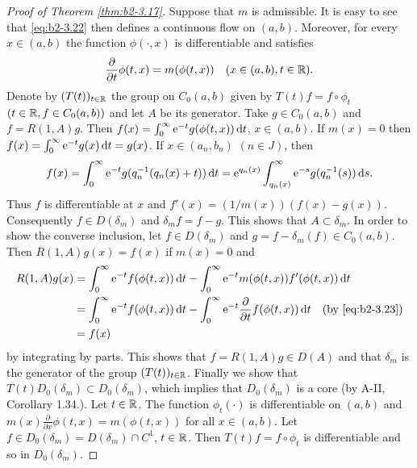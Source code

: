 \begin{proof}[Proof of Theorem \ref{thm:b2-3.17}]
Suppose that $m$ is admissible.
It is easy to see that \eqref{eq:b2-3.22} then defines a continuous flow on $(a,b)$.
Moreover, for every $x \in (a,b)$ the function $\phi(\cdot,x)$ is differentiable and satisfies
\begin{equation}\label{eq:b2-3.23}
\frac{\partial}{\partial t}\phi(t,x) = m(\phi(t,x)) \quad (x \in (a,b), t \in \mathbb{R}).
\end{equation}
Denote by $(T(t))_{t \in \mathbb{R}}$ the group on $C_{0}(a,b)$ given by $T(t)f = f \circ \phi_{t}$ $(t \in \mathbb{R}, f \in C_{0}(a,b))$ and let $A$ be its generator.
Take $g \in C_{0}(a,b)$ and $f = R(1,A)g$.
Then $f(x) = \int_{0}^{\infty} \mathrm{e}^{-t}g(\phi(t,x)) \mathop{}\!\mathrm{d}{t}$, $x \in (a,b)$.
If $m(x) = 0$ then $f(x) = \int_{0}^{\infty} \mathrm{e}^{-t}g(x) \mathop{}\!\mathrm{d}{t} = g(x)$.
If $x \in (a_{n},b_{n})$ $(n \in J)$, then 
\[
f(x) = \int_{0}^{\infty} \mathrm{e}^{-t}g(q_{n}^{-1}(q_{n}(x) + t)) \mathop{}\!\mathrm{d}{t} = \mathrm{e}^{q_{n}(x)} \int_{q_{n}(x)}^{\infty} \mathrm{e}^{-s}g(q_{n}^{-1}(s)) \mathop{}\!\mathrm{d}{s}.
\]
Thus $f$ is differentiable at $x$ and $f'(x) = (1/m(x))(f(x) - g(x))$.
Consequently $f \in D(\delta_{m})$ and $\delta_{m}f = f - g$.
This shows that $A \subset \delta_{m}$.
In order to show the converse inclusion, let $f \in D(\delta_{m})$ and $g = f - \delta_{m}(f) \in C_{0}(a,b)$.
Then $R(1,A)g(x) = f(x)$ if $m(x) = 0$ and 
\begin{align*}
R(1,A)g(x) &= \int_{0}^{\infty} \mathrm{e}^{-t}f(\phi(t,x)) \mathop{}\!\mathrm{d}{t} - \int_{0}^{\infty} \mathrm{e}^{-t}m(\phi(t,x))f'(\phi(t,x)) \mathop{}\!\mathrm{d}{t} \\
           &= \int_{0}^{\infty} \mathrm{e}^{-t}f(\phi(t,x)) \mathop{}\!\mathrm{d}{t} - \int_{0}^{\infty} \mathrm{e}^{-t}\frac{\partial}{\partial t}f(\phi(t,x)) \mathop{}\!\mathrm{d}{t} 
           \quad \text{(by \eqref{eq:b2-3.23})} \\
           &= f(x) 
\end{align*}
by integrating by parts.
This shows that $f = R(1,A)g \in D(A)$ and that $\delta_{m}$ is the generator of the group $(T(t))_{t \in \mathbb{R}}$.
Finally we show that $T(t)D_{0}(\delta_{m}) \subset D_{0}(\delta_{m})$, which implies that $D_{0}(\delta_{m})$ is a core (by A-II, Corollary 1.34.).
Let $t \in \mathbb{R}$.
The function $\phi_{t}(\cdot)$ is
differentiable on $(a,b)$ and $m(x)\frac{\partial}{\partial x}\phi(t,x) = m(\phi(t,x))$ for all $x \in (a,b)$.
Let $f \in D_{0}(\delta_{m}) = D(\delta_{m}) \cap C^{1}$, $t \in \mathbb{R}$.
Then $T(t)f = f \circ \phi_{t}$ is differentiable and so in $D_{0}(\delta_{m})$.


\end{proof}
